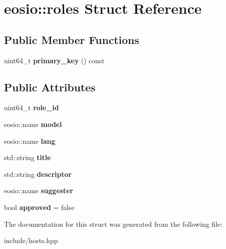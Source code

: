 \hypertarget{structeosio_1_1roles}{}\section{eosio\+:\+:roles Struct Reference}
\label{structeosio_1_1roles}
\subsection*{Public Member Functions}
\begin{DoxyCompactItemize}
\item 
\mbox{\label{structeosio_1_1roles_a8bcd9990e815112f987048d36a8ca160}} 
uint64\+\_\+t {\bfseries primary\+\_\+key} () const
\end{DoxyCompactItemize}
\subsection*{Public Attributes}
\begin{DoxyCompactItemize}
\item 
\mbox{\label{structeosio_1_1roles_a72beced178e51afae83c592f5bd7c47a}} 
uint64\+\_\+t {\bfseries role\+\_\+id}
\item 
\mbox{\label{structeosio_1_1roles_a64633ea36d24cec9d1029d97a77b46b4}} 
eosio\+::name {\bfseries model}
\item 
\mbox{\label{structeosio_1_1roles_ad603553a148866edea522ac6f58c9f4d}} 
eosio\+::name {\bfseries lang}
\item 
\mbox{\label{structeosio_1_1roles_ad5be62ec99cba1e92263dffea2a0f431}} 
std\+::string {\bfseries title}
\item 
\mbox{\label{structeosio_1_1roles_ae0eb7425b4b9b9c1492ea1ff4fd938f0}} 
std\+::string {\bfseries descriptor}
\item 
\mbox{\label{structeosio_1_1roles_ac98c1d53074f078a594f58a3854c3fcd}} 
eosio\+::name {\bfseries suggester}
\item 
\mbox{\label{structeosio_1_1roles_a474c7db053fcfb9b27526a04ed6485e5}} 
bool {\bfseries approved} = false
\end{DoxyCompactItemize}


The documentation for this struct was generated from the following file\+:\begin{DoxyCompactItemize}
\item 
include/hosts.\+hpp\end{DoxyCompactItemize}
